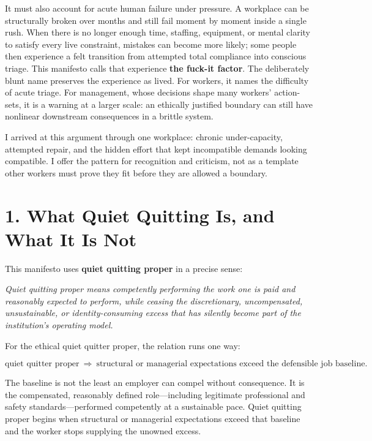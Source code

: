 \documentclass[11pt,oneside]{article}
\renewenvironment{quote}
  {\begin{tcolorbox}[
      enhanced,
      breakable,
      colback=ManifestLight,
      colframe=ManifestRule,
      boxrule=0pt,
      leftrule=3pt,
      arc=0pt,
      outer arc=0pt,
      left=10pt,right=10pt,top=8pt,bottom=8pt,
      before skip=0.8em,after skip=0.8em
    ]\itshape}
  {\end{tcolorbox}}
\begin{document}
It must also account for acute human failure under pressure. A workplace
can be structurally broken over months and still fail moment by moment
inside a single rush. When there is no longer enough time, staffing,
equipment, or mental clarity to satisfy every live constraint, mistakes
can become more likely; some people then experience a felt transition
from attempted total compliance into conscious triage. This manifesto
calls that experience \textbf{the fuck-it factor}. The deliberately
blunt name preserves the experience as lived. For workers, it names the
difficulty of acute triage. For management, whose decisions shape many
workers' action-sets, it is a warning at a larger scale: an ethically
justified boundary can still have nonlinear downstream consequences in a
brittle system.

I arrived at this argument through one workplace: chronic
under-capacity, attempted repair, and the hidden effort that kept
incompatible demands looking compatible. I offer the pattern for
recognition and criticism, not as a template other workers must prove
they fit before they are allowed a boundary.

\hypertarget{what-quiet-quitting-is-and-what-it-is-not}{%
\section{1. What Quiet Quitting Is, and What It Is
Not}\label{what-quiet-quitting-is-and-what-it-is-not}}

This manifesto uses \textbf{quiet quitting proper} in a precise sense:

\begin{quote}
Quiet quitting proper means competently performing the work one is paid
and reasonably expected to perform, while ceasing the discretionary,
uncompensated, unsustainable, or identity-consuming excess that has
silently become part of the institution's operating model.
\end{quote}

For the ethical quiet quitter proper, the relation runs one way:

\[
\boxed{\text{quiet quitter proper}\ \Longrightarrow\ \text{structural or managerial expectations exceed the defensible job baseline}.}
\]

The baseline is not the least an employer can compel without
consequence. It is the compensated, reasonably defined role---including
legitimate professional and safety standards---performed competently at
a sustainable pace. Quiet quitting proper begins when structural or
managerial expectations exceed that baseline and the worker stops
supplying the unowned excess.
\end{document}
